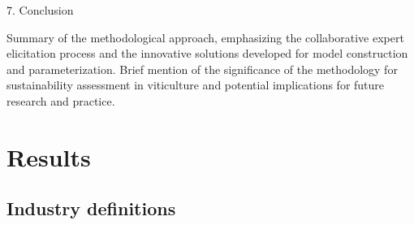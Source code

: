 7. Conclusion

    Summary of the methodological approach, emphasizing the collaborative expert elicitation process and the innovative solutions developed for model construction and parameterization.
    Brief mention of the significance of the methodology for sustainability assessment in viticulture and potential implications for future research and practice.

\section{Results}

\subsection{Industry definitions}


